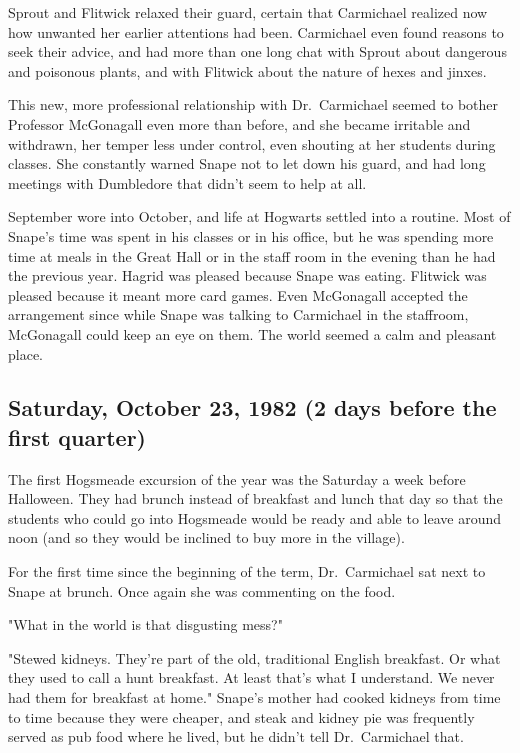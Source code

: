 Sprout and Flitwick relaxed their guard, certain that Carmichael realized now how unwanted her earlier attentions had been. Carmichael even found reasons to seek their advice, and had more than one long chat with Sprout about dangerous and poisonous plants, and with Flitwick about the nature of hexes and jinxes.

This new, more professional relationship with Dr.~Carmichael seemed to bother Professor McGonagall even more than before, and she became irritable and withdrawn, her temper less under control, even shouting at her students during classes. She constantly warned Snape not to let down his guard, and had long meetings with Dumbledore that didn't seem to help at all.

September wore into October, and life at Hogwarts settled into a routine. Most of Snape's time was spent in his classes or in his office, but he was spending more time at meals in the Great Hall or in the staff room in the evening than he had the previous year. Hagrid was pleased because Snape was eating. Flitwick was pleased because it meant more card games. Even McGonagall accepted the arrangement since while Snape was talking to Carmichael in the staffroom, McGonagall could keep an eye on them. The world seemed a calm and pleasant place.

\subsection{Saturday, October 23, 1982 (2 days before the first quarter)}

The first Hogsmeade excursion of the year was the Saturday a week before Halloween. They had brunch instead of breakfast and lunch that day so that the students who could go into Hogsmeade would be ready and able to leave around noon (and so they would be inclined to buy more in the village).

For the first time since the beginning of the term, Dr.~Carmichael sat next to Snape at brunch. Once again she was commenting on the food.

"What in the world is that disgusting mess?"

"Stewed kidneys. They're part of the old, traditional English breakfast. Or what they used to call a hunt breakfast. At least that's what I understand. We never had them for breakfast at home." Snape's mother had cooked kidneys from time to time because they were cheaper, and steak and kidney pie was frequently served as pub food where he lived, but he didn't tell Dr.~Carmichael that.

